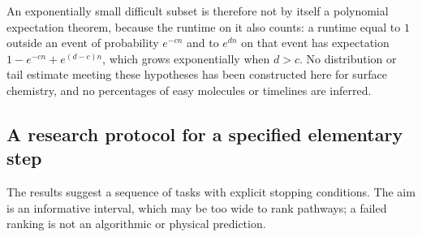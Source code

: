 \documentclass[11pt,a4paper]{article}
\theoremstyle{plain}
\theoremstyle{definition}
\theoremstyle{remark}
\begin{document}
An exponentially small difficult subset is therefore not by itself a polynomial
expectation theorem, because the runtime on it also counts: a runtime equal to
$1$ outside an event of probability $e^{-cn}$ and to $e^{dn}$ on that event has
expectation $1-e^{-cn}+e^{(d-c)n}$, which grows exponentially when $d>c$. No
distribution or tail estimate meeting these hypotheses has been constructed here
for surface chemistry, and no percentages of easy molecules or timelines are
inferred.

\subsection{A research protocol for a specified elementary step}
The results suggest a sequence of tasks with explicit stopping conditions. The
aim is an informative interval, which may be too wide to rank pathways; a failed
ranking is not an algorithmic or physical prediction.
\end{document}
